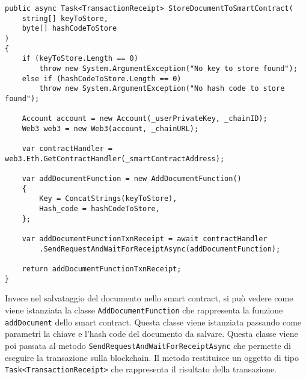 \begin{lstlisting}[language=CSharp]
public async Task<TransactionReceipt> StoreDocumentToSmartContract(
    string[] keyToStore,
    byte[] hashCodeToStore
)
{
    if (keyToStore.Length == 0)
        throw new System.ArgumentException("No key to store found");
    else if (hashCodeToStore.Length == 0) 
        throw new System.ArgumentException("No hash code to store found");

    Account account = new Account(_userPrivateKey, _chainID);
    Web3 web3 = new Web3(account, _chainURL);

    var contractHandler = web3.Eth.GetContractHandler(_smartContractAddress);

    var addDocumentFunction = new AddDocumentFunction()
    {
        Key = ConcatStrings(keyToStore),
        Hash_code = hashCodeToStore,
    };

    var addDocumentFunctionTxnReceipt = await contractHandler
        .SendRequestAndWaitForReceiptAsync(addDocumentFunction);

    return addDocumentFunctionTxnReceipt;
}\end{lstlisting}

Invece nel salvataggio del documento nello smart contract, si può vedere come
viene istanziata la classe \texttt{AddDocumentFunction} che rappresenta la
funzione \texttt{addDocument} dello smart contract. Questa classe viene
istanziata passando come parametri la chiave e l'hash code del documento da
salvare. Questa classe viene poi passata al metodo
\texttt{SendRequestAndWaitForReceiptAsync} che permette di eseguire la
transazione sulla blockchain. Il metodo restituisce un oggetto di tipo
\texttt{Task<TransactionReceipt>} che rappresenta il risultato della
transazione.
